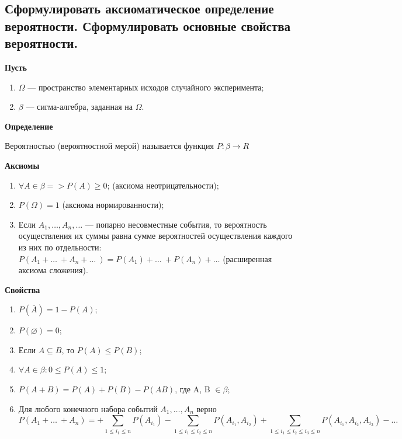 \subsection{Сформулировать аксиоматическое определение вероятности. Сформулировать основные свойства вероятности.}

\textbf{Пусть} 

\begin{enumerate}
	\item $\Omega$ --- пространство элементарных исходов случайного эксперимента;
	\item $\beta$ --- сигма-алгебра, заданная на $\Omega$.
\end{enumerate}

\textbf{Определение}

Вероятностью (вероятностной мерой) называется функция $P: \beta \rightarrow R$

\textbf{Аксиомы}

\begin{enumerate}
	\item $\forall A \in \beta => P(A) \geqslant 0$; (аксиома неотрицательности);
	\item $P(\Omega) = 1$ (аксиома нормированности);
	\item Если $A_1, \dots, A_n, \dots$ --- попарно несовместные события, то вероятность осуществления их суммы равна сумме вероятностей осуществления каждого из них по отдельности: $P(A_1 + \dots\ + A_n + \dots\ ) = P(A_1) + \dots\ + P(A_n) + \dots$ (расширенная аксиома сложения). 
\end{enumerate}

\textbf{Свойства}

\begin{enumerate}
	\item $P(\overline{A}) = 1 - P(A)$;
	\item $P(\varnothing) = 0$;
	\item Если $A \subseteq B$, то $P(A) \leqslant P(B)$;
	\item $\forall A \in \beta: 0 \leqslant P(A) \leqslant 1$;
	\item $P(A + B) = P(A) + P(B) - P(AB)$, где A, B $\in \beta$;
	\item Для любого конечного набора событий $A_1, \dots, A_n$ верно
	\begin{equation}
		P(A_1 + \dots\ + A_n) = + \sum\limits_{1 \leqslant i_1 \leqslant n}P(A_{i_1}) - \sum\limits_{1 \leqslant i_1 \leqslant i_2 \leqslant n}P(A_{i_1}, A_{i_2}) + \sum\limits_{1 \leqslant i_1 \leqslant i_2 \leqslant i_3 \leqslant n}P(A_{i_1}, A_{i_2}, A_{i_3}) - \dots
	\end{equation}
\end{enumerate}

